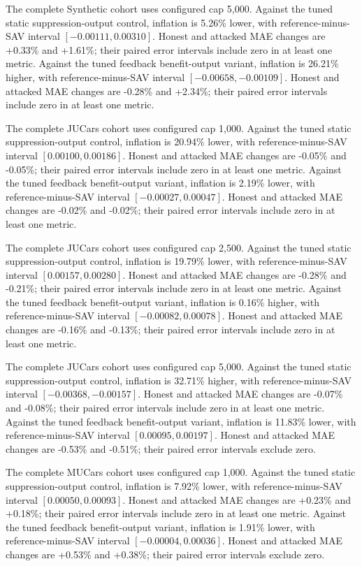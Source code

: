The complete Synthetic cohort uses configured cap 5,000. Against the tuned static suppression-output control, inflation is 5.26\% lower, with reference-minus-SAV interval $[-0.00111,0.00310]$. Honest and attacked MAE changes are +0.33\% and +1.61\%; their paired error intervals include zero in at least one metric. Against the tuned feedback benefit-output variant, inflation is 26.21\% higher, with reference-minus-SAV interval $[-0.00658,-0.00109]$. Honest and attacked MAE changes are -0.28\% and +2.34\%; their paired error intervals include zero in at least one metric.

The complete JUCars cohort uses configured cap 1,000. Against the tuned static suppression-output control, inflation is 20.94\% lower, with reference-minus-SAV interval $[0.00100,0.00186]$. Honest and attacked MAE changes are -0.05\% and -0.05\%; their paired error intervals include zero in at least one metric. Against the tuned feedback benefit-output variant, inflation is 2.19\% lower, with reference-minus-SAV interval $[-0.00027,0.00047]$. Honest and attacked MAE changes are -0.02\% and -0.02\%; their paired error intervals include zero in at least one metric.

The complete JUCars cohort uses configured cap 2,500. Against the tuned static suppression-output control, inflation is 19.79\% lower, with reference-minus-SAV interval $[0.00157,0.00280]$. Honest and attacked MAE changes are -0.28\% and -0.21\%; their paired error intervals include zero in at least one metric. Against the tuned feedback benefit-output variant, inflation is 0.16\% higher, with reference-minus-SAV interval $[-0.00082,0.00078]$. Honest and attacked MAE changes are -0.16\% and -0.13\%; their paired error intervals include zero in at least one metric.

The complete JUCars cohort uses configured cap 5,000. Against the tuned static suppression-output control, inflation is 32.71\% higher, with reference-minus-SAV interval $[-0.00368,-0.00157]$. Honest and attacked MAE changes are -0.07\% and -0.08\%; their paired error intervals include zero in at least one metric. Against the tuned feedback benefit-output variant, inflation is 11.83\% lower, with reference-minus-SAV interval $[0.00095,0.00197]$. Honest and attacked MAE changes are -0.53\% and -0.51\%; their paired error intervals exclude zero.

The complete MUCars cohort uses configured cap 1,000. Against the tuned static suppression-output control, inflation is 7.92\% lower, with reference-minus-SAV interval $[0.00050,0.00093]$. Honest and attacked MAE changes are +0.23\% and +0.18\%; their paired error intervals include zero in at least one metric. Against the tuned feedback benefit-output variant, inflation is 1.91\% lower, with reference-minus-SAV interval $[-0.00004,0.00036]$. Honest and attacked MAE changes are +0.53\% and +0.38\%; their paired error intervals exclude zero.

